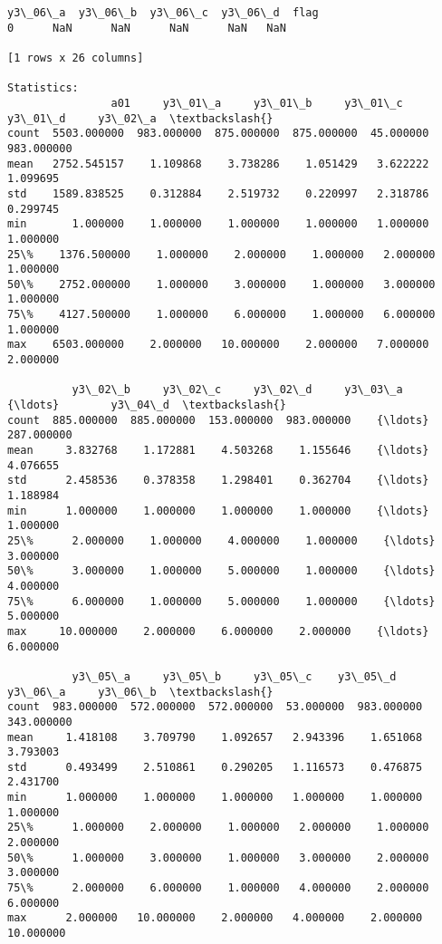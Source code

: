 \documentclass[11pt]{article}
\begin{document}
\begin{Verbatim}[commandchars=\\\{\}]
   y3\_06\_a  y3\_06\_b  y3\_06\_c  y3\_06\_d  flag  
0      NaN      NaN      NaN      NaN   NaN  

[1 rows x 26 columns]

Statistics: 
                a01     y3\_01\_a     y3\_01\_b     y3\_01\_c    y3\_01\_d     y3\_02\_a  \textbackslash{}
count  5503.000000  983.000000  875.000000  875.000000  45.000000  983.000000   
mean   2752.545157    1.109868    3.738286    1.051429   3.622222    1.099695   
std    1589.838525    0.312884    2.519732    0.220997   2.318786    0.299745   
min       1.000000    1.000000    1.000000    1.000000   1.000000    1.000000   
25\%    1376.500000    1.000000    2.000000    1.000000   2.000000    1.000000   
50\%    2752.000000    1.000000    3.000000    1.000000   3.000000    1.000000   
75\%    4127.500000    1.000000    6.000000    1.000000   6.000000    1.000000   
max    6503.000000    2.000000   10.000000    2.000000   7.000000    2.000000   

          y3\_02\_b     y3\_02\_c     y3\_02\_d     y3\_03\_a    {\ldots}        y3\_04\_d  \textbackslash{}
count  885.000000  885.000000  153.000000  983.000000    {\ldots}     287.000000   
mean     3.832768    1.172881    4.503268    1.155646    {\ldots}       4.076655   
std      2.458536    0.378358    1.298401    0.362704    {\ldots}       1.188984   
min      1.000000    1.000000    1.000000    1.000000    {\ldots}       1.000000   
25\%      2.000000    1.000000    4.000000    1.000000    {\ldots}       3.000000   
50\%      3.000000    1.000000    5.000000    1.000000    {\ldots}       4.000000   
75\%      6.000000    1.000000    5.000000    1.000000    {\ldots}       5.000000   
max     10.000000    2.000000    6.000000    2.000000    {\ldots}       6.000000   

          y3\_05\_a     y3\_05\_b     y3\_05\_c    y3\_05\_d     y3\_06\_a     y3\_06\_b  \textbackslash{}
count  983.000000  572.000000  572.000000  53.000000  983.000000  343.000000   
mean     1.418108    3.709790    1.092657   2.943396    1.651068    3.793003   
std      0.493499    2.510861    0.290205   1.116573    0.476875    2.431700   
min      1.000000    1.000000    1.000000   1.000000    1.000000    1.000000   
25\%      1.000000    2.000000    1.000000   2.000000    1.000000    2.000000   
50\%      1.000000    3.000000    1.000000   3.000000    2.000000    3.000000   
75\%      2.000000    6.000000    1.000000   4.000000    2.000000    6.000000   
max      2.000000   10.000000    2.000000   4.000000    2.000000   10.000000   


\end{Verbatim}
\end{document}
